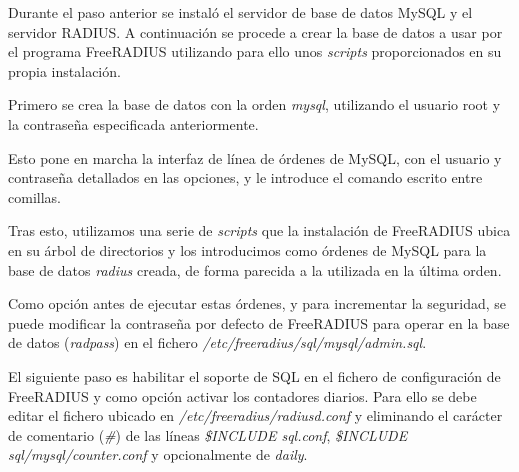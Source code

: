 Durante el paso anterior se instaló el servidor de base de datos MySQL y el servidor RADIUS. A continuación se procede a crear la base de datos a usar por el programa FreeRADIUS utilizando para ello unos \emph{scripts} proporcionados en su propia instalación.

Primero se crea la base de datos con la orden \emph{mysql}, utilizando el usuario root y la contraseña especificada anteriormente.


Esto pone en marcha la interfaz de línea de órdenes de MySQL, con el usuario y contraseña detallados en las opciones, y le introduce el comando escrito entre comillas.

Tras esto, utilizamos una serie de \emph{scripts} que la instalación de FreeRADIUS ubica en su árbol de directorios y los introducimos como órdenes de MySQL para la base de datos \emph{radius} creada, de forma parecida a la utilizada en la última orden.


Como opción antes de ejecutar estas órdenes, y para incrementar la seguridad, se puede modificar la contraseña por defecto de FreeRADIUS para operar en la base de datos (\emph{radpass}) en el fichero \emph{/etc/freeradius/sql/mysql/admin.sql}.

El siguiente paso es habilitar el soporte de SQL en el fichero de configuración de FreeRADIUS y como opción activar los contadores diarios. Para ello se debe editar el fichero ubicado en \emph{/etc/freeradius/radiusd.conf} y eliminando el carácter de comentario (\emph{\#}) de las líneas \emph{\$INCLUDE sql.conf}, \emph{\$INCLUDE sql/mysql/counter.conf} y opcionalmente de \emph{daily}.

